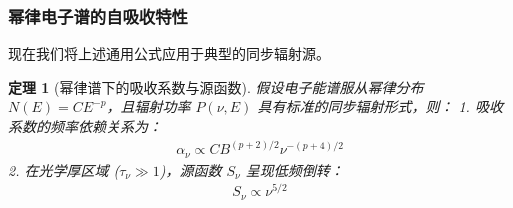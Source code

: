 \documentclass[12pt,oneside]{ctexart}
\theoremstyle{definition}
\theoremstyle{plain}
\newtheorem{theorem}[definition]{定理}
\theoremstyle{remark}
\begin{document}
\subsubsection{幂律电子谱的自吸收特性}

现在我们将上述通用公式应用于典型的同步辐射源。

\begin{theorem}[幂律谱下的吸收系数与源函数]
    假设电子能谱服从幂律分布 $N(E) = C E^{-p}$，且辐射功率 $P(\nu, E)$ 具有标准的同步辐射形式，则：
    1. 吸收系数的频率依赖关系为：
    \begin{align}
        \alpha_{\nu} \propto C B^{(p+2)/2} \nu^{-(p+4)/2} \label{eq:powerlaw_alpha}
    \end{align}
    2. 在光学厚区域 ($\tau_{\nu} \gg 1$)，源函数 $S_{\nu}$ 呈现低频倒转：
    \begin{align}
        S_{\nu} \propto \nu^{5/2} \label{eq:source_function_5_2}
    \end{align}
\end{theorem}
\end{document}
